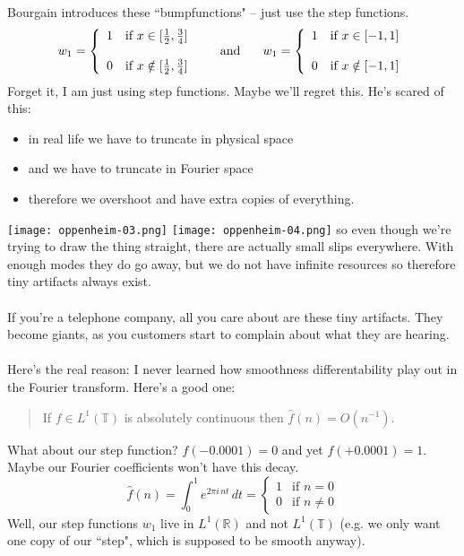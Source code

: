 \documentclass[12pt]{article}
\begin{document}
\noindent Bourgain introduces these ``bumpfunctions" -- just use the step functions. 
$$w_1 = \left\{
\begin{array}{cc} 
1 &  \text{if }x \in [\frac{1}{2}, \frac{3}{4}]\\ \\
0 & \text{if }x \notin [\frac{1}{2}, \frac{3}{4}] \end{array}  \right. 
\hspace{0.25in}\text{and}\hspace{0.25in}
w_1 = \left\{
\begin{array}{cc} 
1 &  \text{if }x \in [-1,1]\\ \\
0 & \text{if }x \notin [-1,1]\end{array}  \right. $$
Forget it, I am just using step functions.  Maybe we'll regret this.  He's scared of this:
\begin{itemize}
\item in real life we have to truncate in physical space
\item and we have to truncate in Fourier space
\item therefore we overshoot and have extra copies of everything.
\end{itemize}
\texttt{[image: oppenheim-03.png]} \hspace{1in}
\texttt{[image: oppenheim-04.png]}
so even though we're trying to draw the thing straight, there are actually small slips everywhere.  With enough modes they do go away, but we do not have infinite resources so therefore tiny artifacts always exist. \\ \\
If you're a telephone company, all you care about are these tiny artifacts.  They become giants, as you customers start to complain about what they are hearing. \\ \\
Here's the real reason: {\color{blue!20!white} I never learned how smoothness differentability play out in the Fourier transform}.  Here's a good one:
\begin{quotation}
If $f \in L^1(\mathbb{T})$ is absolutely continuous then $\hat{f}(n) = O(n^{-1})$.
\end{quotation}
What about our step function?  $f(-0.0001) = 0$ and yet $f(+0.0001)=1$. Maybe our Fourier coefficients won't have this decay. 
$$ \hat{f}(n) = \int_0^1 e^{2\pi i \, n t} \, dt = \left\{ 
\begin{array}{cc}
1 & \text{if }n=0 \\ 
0 & \text{if }n\neq 0 \end{array} \right. $$
Well, our step functions $w_1$ live in $L^1(\mathbb{R})$ and not $L^1(\mathbb{T})$ (e.g. we only want one copy of our ``step", which is supposed to be smooth anyway).
\end{document}
